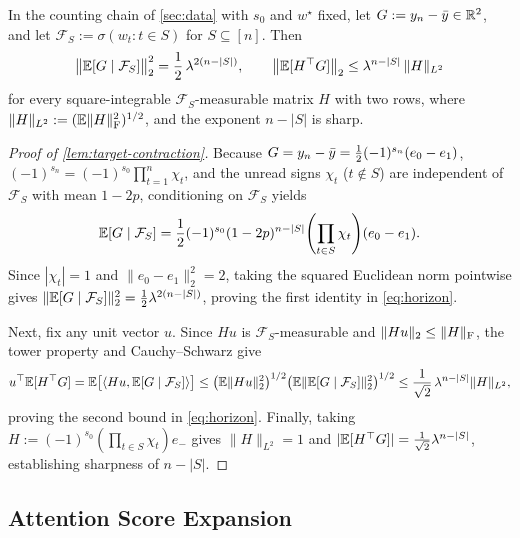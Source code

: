\begin{lemma}
\label{lem:target-contraction}
In the counting chain of \cref{sec:data} with $s_0$ and $w^\star$ fixed, let $G := y_n - \bar y \in \mathbb R^2$, and let $\mathcal F_S := \sigma(w_t : t \in S)$ for $S \subseteq [n]$. Then
\begin{equation}
 \bigl\|\mathbb E[G \mid \mathcal F_S]\bigr\|_2^2 = \frac{1}{2}\,\lambda^{2(n-|S|)}, \qquad
 \bigl\|\mathbb E[H^\top G]\bigr\|_2 \le \lambda^{n-|S|}\,\|H\|_{L^2}
 \label{eq:horizon}
\end{equation}
for every square-integrable $\mathcal F_S$-measurable matrix $H$ with two rows, where $\|H\|_{L^2} := (\mathbb E\|H\|_{\mathrm{F}}^2)^{1/2}$, and the exponent $n - |S|$ is sharp.
\end{lemma}
\begin{proof}[Proof of \cref{lem:target-contraction}]
Because $G = y_n - \bar y = \frac{1}{2}(-1)^{s_n}(e_0 - e_1)$, $(-1)^{s_n} = (-1)^{s_0}\prod_{t=1}^n \chi_t$, and the unread signs $\chi_t$ ($t \notin S$) are independent of $\mathcal F_S$ with mean $1 - 2p$, conditioning on $\mathcal F_S$ yields
\[
  \mathbb E[G \mid \mathcal F_S]
  = \frac{1}{2}(-1)^{s_0}(1-2p)^{n-|S|}\Biggl(\prod_{t\in S}\chi_t\Biggr)(e_0 - e_1).
\]
Since $|\chi_t| = 1$ and $\|e_0 - e_1\|_2^2 = 2$, taking the squared Euclidean norm pointwise gives $\|\mathbb E[G \mid \mathcal F_S]\|_2^2 = \frac{1}{2}\lambda^{2(n-|S|)}$, proving the first identity in \cref{eq:horizon}.

Next, fix any unit vector $u$. Since $H u$ is $\mathcal F_S$-measurable and $\|H u\|_2 \le \|H\|_{\mathrm{F}}$, the tower property and Cauchy--Schwarz give
\[
  u^\top\mathbb E[H^\top G]
  = \mathbb E\bigl[\langle H u, \mathbb E[G \mid \mathcal F_S]\rangle\bigr]
  \le \bigl(\mathbb E\|H u\|_2^2\bigr)^{1/2}\bigl(\mathbb E\|\mathbb E[G \mid \mathcal F_S]\|_2^2\bigr)^{1/2}
  \le \frac{1}{\sqrt 2}\,\lambda^{n-|S|}\|H\|_{L^2},
\]
proving the second bound in \cref{eq:horizon}. Finally, taking $H := (-1)^{s_0}(\prod_{t\in S}\chi_t)e_-$ gives $\|H\|_{L^2} = 1$ and $|\mathbb E[H^\top G]| = \frac{1}{\sqrt 2}\lambda^{n-|S|}$, establishing sharpness of $n - |S|$.
\end{proof}
\label{rem:tight}

\subsection{Attention Score Expansion}
\label{app:model-spectrum}
\label{app:network}

